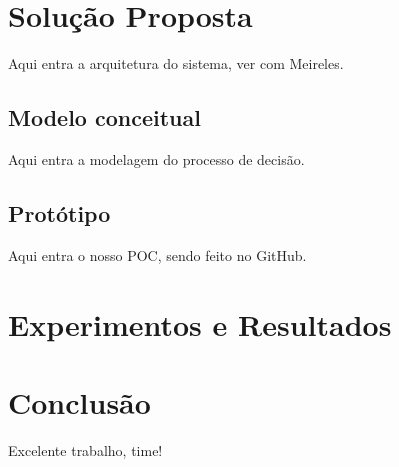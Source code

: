 \documentclass[pfc]{imetex}
\begin{document}
\label{relacionados}


\chapter{Solução Proposta}
\label{solucao}
Aqui entra a arquitetura do sistema, ver com Meireles.\
\begin{center}
    \noindent{}
\end{center}

\section{Modelo conceitual}
\label{modelo}
Aqui entra a modelagem do processo de decisão.

\section{Protótipo}
\label{prototipo}
Aqui entra o nosso POC, sendo feito no GitHub.

\chapter{Experimentos e Resultados}
\label{experimentos}

\chapter{Conclusão}
\label{conclusao}

Excelente trabalho, time!
\end{document}
